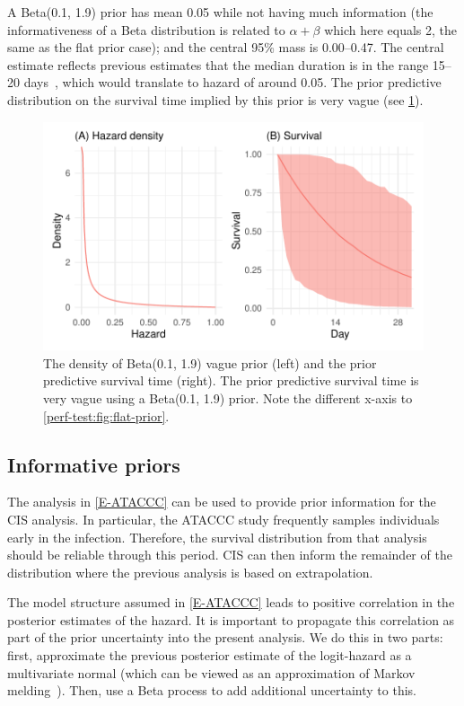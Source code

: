 \documentclass[thesis.tex]{subfiles}
\begin{document}
A Beta(0.1, 1.9) prior has mean 0.05 while not having much information (the informativeness of a Beta distribution is related to $\alpha + \beta$ which here equals 2, the same as the flat prior case); and the central 95\% mass is 0.00--0.47.
The central estimate reflects previous estimates that the median duration is in the range 15--20 days~\autocite{cevikShedding}, which would translate to hazard of around 0.05.
The prior predictive distribution on the survival time implied by this prior is very vague (see \cref{perf-test:fig:vague-prior}).
\begin{figure}
  \centering \includegraphics{cis-perfect-testing/vague-prior}
  \caption{The density of Beta(0.1, 1.9) vague prior (left) and the prior predictive survival time (right). The prior predictive survival time is very vague using a Beta(0.1, 1.9) prior. Note the different x-axis to \cref{perf-test:fig:flat-prior}. \label{perf-test:fig:vague-prior}}
\end{figure}

\subsection{Informative priors}

The analysis in \cref{E-ATACCC} can be used to provide prior information for the CIS analysis.
In particular, the ATACCC study frequently samples individuals early in the infection.
Therefore, the survival distribution from that analysis should be reliable through this period.
CIS can then inform the remainder of the distribution where the previous analysis is based on extrapolation.

The model structure assumed in \cref{E-ATACCC} leads to positive correlation in the posterior estimates of the hazard.
It is important to propagate this correlation as part of the prior uncertainty into the present analysis.
We do this in two parts: first, approximate the previous posterior estimate of the logit-hazard as a multivariate normal (which can be viewed as an approximation of Markov melding~\autocite{goudieJoining}).
Then, use a Beta process to add additional uncertainty to this.
\end{document}
